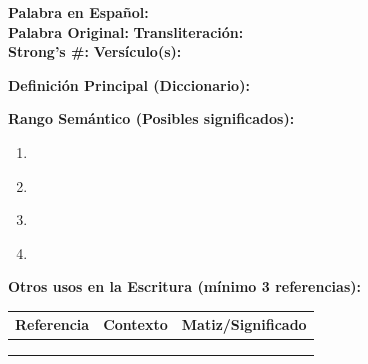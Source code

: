 \documentclass[11pt,a4paper]{article}
\begin{document}
\begin{lexiconbox}
\textbf{Palabra en Español:} \underline{\hspace{8cm}}\\[0.5cm]
\textbf{Palabra Original:} \underline{\hspace{4cm}} \quad \textbf{Transliteración:} \underline{\hspace{4cm}}\\[0.5cm]
\textbf{Strong's \#:} \underline{\hspace{3cm}} \quad \textbf{Versículo(s):} \underline{\hspace{5cm}}
\end{lexiconbox}

\textbf{Definición Principal (Diccionario):}
\vspace{2cm}

\textbf{Rango Semántico (Posibles significados):}
\begin{enumerate}[leftmargin=1cm]
    \item \underline{\hspace{12cm}}
    \item \underline{\hspace{12cm}}
    \item \underline{\hspace{12cm}}
    \item \underline{\hspace{12cm}}
\end{enumerate}

\textbf{Otros usos en la Escritura (mínimo 3 referencias):}

\vspace{0.5cm}

\begin{tabularx}{\textwidth}{|L{2.5cm}|L{5.5cm}|X|}
\hline
\textbf{Referencia} & \textbf{Contexto} & \textbf{Matiz/Significado} \\
\hline
\vspace{1.5cm} & \vspace{1.5cm} & \vspace{1.5cm} \\
\hline
\vspace{1.5cm} & \vspace{1.5cm} & \vspace{1.5cm} \\
\hline
\vspace{1.5cm} & \vspace{1.5cm} & \vspace{1.5cm} \\
\hline
\end{tabularx}
\end{document}
